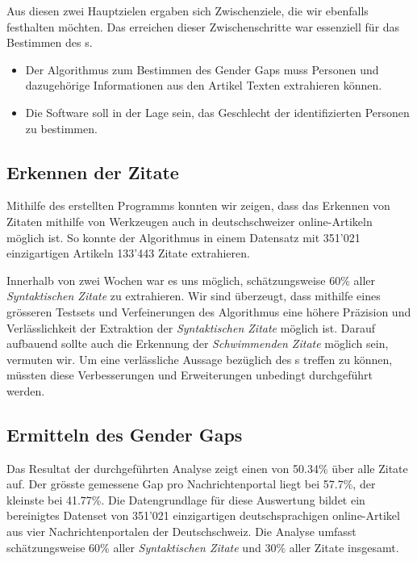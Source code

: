 Aus diesen zwei Hauptzielen ergaben sich Zwischenziele, die wir ebenfalls festhalten möchten.
Das erreichen dieser Zwischenschritte war essenziell für das Bestimmen des s.
\begin{itemize}
    \item Der Algorithmus zum Bestimmen des Gender Gaps muss Personen und dazugehörige
    Informationen aus den Artikel Texten extrahieren können.
    \item Die Software soll in der Lage sein, das Geschlecht der identifizierten Personen zu bestimmen.
\end{itemize}

\subsection{Erkennen der Zitate}

Mithilfe des erstellten Programms konnten wir zeigen, dass das Erkennen von Zitaten mithilfe von  Werkzeugen
auch in deutschschweizer online-Artikeln möglich ist. So konnte der Algorithmus in einem Datensatz
mit 351'021 einzigartigen Artikeln 133'443 Zitate extrahieren.

Innerhalb von zwei Wochen war es uns
möglich, schätzungsweise 60\% aller \textsl{Syntaktischen Zitate} zu extrahieren.
Wir sind überzeugt, dass mithilfe eines grösseren Testsets und Verfeinerungen des Algorithmus
eine höhere Präzision und Verlässlichkeit der Extraktion der \textsl{Syntaktischen Zitate} möglich ist.
Darauf aufbauend sollte auch die Erkennung der \textsl{Schwimmenden Zitate} möglich sein, vermuten wir.
Um eine verlässliche Aussage bezüglich des s treffen zu können, müssten diese Verbesserungen und Erweiterungen unbedingt durchgeführt werden.

\subsection{Ermitteln des Gender Gaps}

Das Resultat der durchgeführten Analyse zeigt einen  von 50.34\% über alle Zitate auf.
Der grösste gemessene Gap pro Nachrichtenportal liegt bei 57.7\%, der kleinste bei 41.77\%.
Die Datengrundlage für diese Auswertung bildet ein bereinigtes Datenset von 351'021 einzigartigen
deutschsprachigen online-Artikel aus vier Nachrichtenportalen der Deutschschweiz. Die Analyse umfasst
schätzungsweise 60\% aller \textsl{Syntaktischen Zitate} und 30\% aller Zitate insgesamt.

